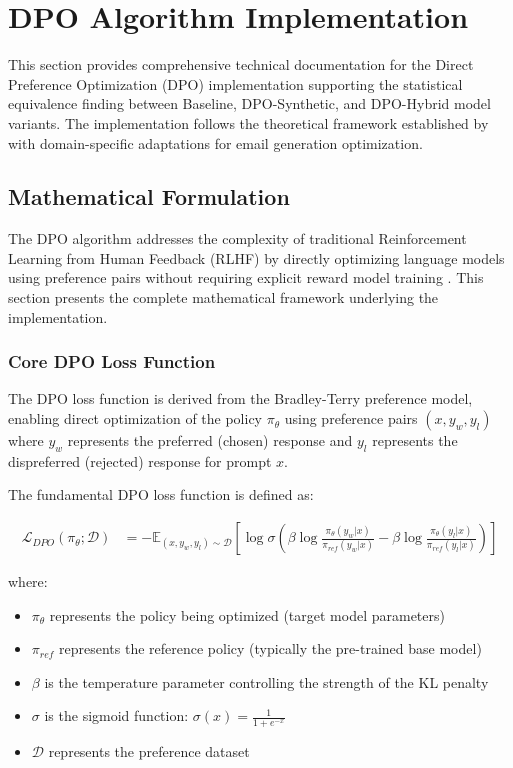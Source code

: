 \section{DPO Algorithm Implementation}
\label{sec:dpo-implementation}

This section provides comprehensive technical documentation for the Direct Preference Optimization (DPO) implementation supporting the statistical equivalence finding between Baseline, DPO-Synthetic, and DPO-Hybrid model variants. The implementation follows the theoretical framework established by \cite{rafailov2023dpo} with domain-specific adaptations for email generation optimization.

\subsection{Mathematical Formulation}
\label{subsec:dpo-mathematical-formulation}

The DPO algorithm addresses the complexity of traditional Reinforcement Learning from Human Feedback (RLHF) by directly optimizing language models using preference pairs without requiring explicit reward model training \cite{rafailov2023dpo}. This section presents the complete mathematical framework underlying the implementation.

\subsubsection{Core DPO Loss Function}

The DPO loss function is derived from the Bradley-Terry preference model, enabling direct optimization of the policy $\pi_\theta$ using preference pairs $(x, y_w, y_l)$ where $y_w$ represents the preferred (chosen) response and $y_l$ represents the dispreferred (rejected) response for prompt $x$.

The fundamental DPO loss function is defined as:

\begin{align}
\mathcal{L}_{DPO}(\pi_\theta; \mathcal{D}) &= -\mathbb{E}_{(x,y_w,y_l) \sim \mathcal{D}} \left[ \log \sigma \left( \beta \log \frac{\pi_\theta(y_w|x)}{\pi_{ref}(y_w|x)} - \beta \log \frac{\pi_\theta(y_l|x)}{\pi_{ref}(y_l|x)} \right) \right] \label{eq:dpo-loss}
\end{align}

where:
\begin{itemize}
    \item $\pi_\theta$ represents the policy being optimized (target model parameters)
    \item $\pi_{ref}$ represents the reference policy (typically the pre-trained base model)
    \item $\beta$ is the temperature parameter controlling the strength of the KL penalty
    \item $\sigma$ is the sigmoid function: $\sigma(x) = \frac{1}{1 + e^{-x}}$
    \item $\mathcal{D}$ represents the preference dataset
\end{itemize}

